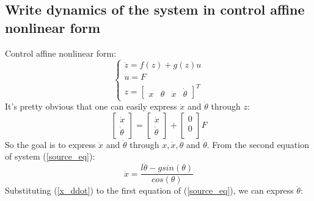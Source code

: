 \documentclass[a4paper,12pt]{article}
\begin{document}
    \subsection{Write dynamics of the system in control affine nonlinear form}
    Control affine nonlinear form:
    \begin{equation}\label{desired_form2}
        \begin{cases}
            \dot z = f(z) + g(z)u\\
            u=F\\
            z = 
            \begin{bmatrix}
                x&
                \theta&
                \dot x&
                \dot \theta    
            \end{bmatrix}^T
        \end{cases}
    \end{equation}
    It's pretty obvious that one can easily express $\dot x$ and $\dot \theta$ 
    through $z$:
    \begin{equation}
        \begin{bmatrix}
            \dot x\\
            \dot \theta
        \end{bmatrix}
        =
        \begin{bmatrix}
            \dot x\\
            \dot \theta    
        \end{bmatrix}
        +
        \begin{bmatrix}
            0\\
            0\\    
        \end{bmatrix}F
    \end{equation}
    So the goal is to express $\ddot x$ and $\ddot \theta$ through $x, \dot x, 
    \theta$ and $\dot \theta$. From the second equation of system (\ref{source_eq}):
    \begin{equation}\label{x_ddot}
        \ddot x = \frac{l\ddot\theta - gsin(\theta)}{cos(\theta)}
    \end{equation}
    Substituting (\ref{x_ddot}) to the first equation of (\ref{source_eq}), we can 
    express $\ddot{\theta}$:
\end{document}
